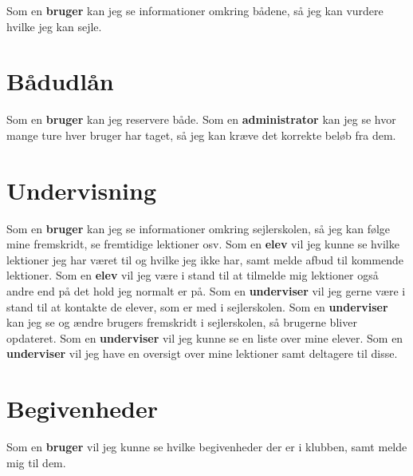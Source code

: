 Som en \textbf{bruger} kan jeg se informationer omkring bådene, så jeg kan vurdere hvilke jeg kan sejle. 

\section{Bådudlån}

Som en \textbf{bruger} kan jeg reservere både.
\newline
Som en \textbf{administrator} kan jeg se hvor mange ture hver bruger har taget, så jeg kan kræve det korrekte beløb fra dem.

\section{Undervisning}
Som en \textbf{bruger} kan jeg se informationer omkring sejlerskolen, så jeg kan følge mine fremskridt, se fremtidige lektioner osv. 
\newline
Som en \textbf{elev} vil jeg kunne se hvilke lektioner jeg har været til og hvilke jeg ikke har, samt melde afbud til kommende lektioner.
\newline
Som en \textbf{elev} vil jeg være i stand til at tilmelde mig lektioner også andre end på det hold jeg normalt er på.
\newline
Som en \textbf{underviser} vil jeg gerne være i stand til at kontakte de elever, som er med i sejlerskolen.
\newline
Som en \textbf{underviser} kan jeg se og ændre brugers fremskridt i sejlerskolen, så brugerne bliver opdateret.
\newline
Som en \textbf{underviser} vil jeg kunne se en liste over mine elever.
\newline
Som en \textbf{underviser} vil jeg have en oversigt over mine lektioner samt deltagere til disse.

\section{Begivenheder}
Som en \textbf{bruger} vil jeg kunne se hvilke begivenheder der er i klubben, samt melde mig til dem.

